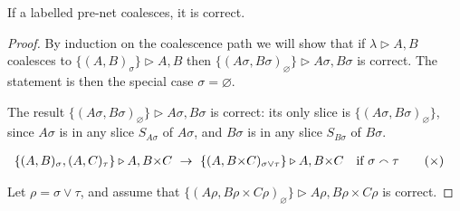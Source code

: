 \documentclass[UKenglish]{lipics-v2016}
\theoremstyle{plain}
\newcommand\+{+}
\renewcommand\*{\times}
\newcommand\net[3]{#1\triangleright #2,#3}
\newcommand\coh{\smallfrown}
\newcommand\join{\vee}
\newcommand\link[3][\sigma]{(#2,#3)_{#1}}
\newcommand\scoal{\rightarrow} %
\begin{document}
\begin{lemma}
If a labelled pre-net coalesces, it is correct. 
\end{lemma}

\begin{proof}
By induction on the coalescence path we will show that if $\net\lambda AB$ coalesces to $\net{\{\link AB\}}AB$ then $\net{\{\link[\varnothing]{A\sigma}{B\sigma}\}}{A\sigma}{B\sigma}$ is correct. The statement is then the special case $\sigma=\varnothing$.

The result $\net{\{\link[\varnothing]{A\sigma}{B\sigma}\}}{A\sigma}{B\sigma}$ is correct: its only slice is $\{\link[\varnothing]{A\sigma}{B\sigma}\}$, since $A\sigma$ is in any slice $S_{A\sigma}$ of $A\sigma$, and $B\sigma$ is in any slice $S_{B\sigma}$ of $B\sigma$.

\renewcommand{\+}{{+}}
\renewcommand{\*}{{\times}}
\begin{align}
	\net{\{\link AB,\link[\tau]AC\}}A{B\*C}
& ~\scoal~ 
	\net{\{\link[\sigma\join\tau]A{B\*C}\}}A{B\*C}\quad\text{if }\sigma\coh\tau
\tag{$\*$}
\end{align}

Let $\rho=\sigma\join\tau$, and assume that $\net{\{\link[\varnothing]{A\rho}{B\rho\*C\rho}\}}{A\rho}{B\rho\*C\rho}$ is correct. 

\end{proof}
\end{document}

